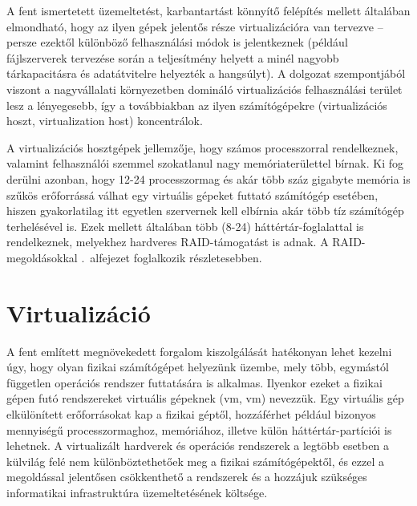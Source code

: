A fent ismertetett üzemeltetést, karbantartást könnyítő felépítés mellett általában elmondható, hogy az ilyen gépek jelentős része virtualizációra van tervezve -- persze ezektől különböző felhasználási módok is jelentkeznek (például fájlszerverek tervezése során a teljesítmény helyett a minél nagyobb tárkapacitásra és adatátvitelre helyezték a hangsúlyt). A dolgozat szempontjából viszont a nagyvállalati környezetben domináló virtualizációs felhasználási terület lesz a lényegesebb, így a továbbiakban az ilyen számítógépekre (virtualizációs hoszt, virtualization host) koncentrálok.

A virtualizációs hosztgépek jellemzője, hogy számos processzorral rendelkeznek, valamint felhasználói szemmel szokatlanul nagy memóriaterülettel bírnak. Ki fog derülni azonban, hogy 12-24 processzormag és akár több száz gigabyte memória is szűkös erőforrássá válhat egy virtuális gépeket futtató számítógép esetében, hiszen gyakorlatilag itt egyetlen szervernek kell elbírnia akár több tíz számítógép terhelésével is. Ezek mellett általában több (8-24) háttértár-foglalattal is rendelkeznek, melyekhez hardveres RAID-támogatást is adnak. A RAID-megoldásokkal .~alfejezet foglalkozik részletesebben.

\section{Virtualizáció}
A fent említett megnövekedett forgalom kiszolgálását hatékonyan lehet kezelni úgy, hogy olyan fizikai számítógépet helyezünk üzembe, mely  több, egymástól független operációs rendszer futtatására is alkalmas. Ilyenkor ezeket a fizikai gépen futó rendszereket virtuális gépeknek (\acrlong{vm}, \acrshort{vm}) nevezzük. Egy virtuális gép elkülönített erőforrásokat kap a fizikai géptől, hozzáférhet például bizonyos mennyiségű processzormaghoz, memóriához, illetve külön háttértár-partíciói is lehetnek. A virtualizált hardverek és operációs rendszerek a legtöbb esetben a külvilág felé nem különböztethetőek meg a fizikai számítógépektől, és ezzel a megoldással jelentősen csökkenthető a rendszerek és a hozzájuk szükséges informatikai infrastruktúra üzemeltetésének költsége.

